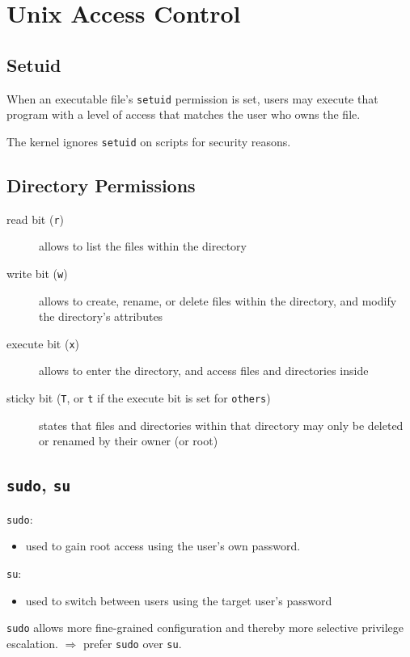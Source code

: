 
\section{Unix Access Control}
\subsection{Setuid}
When an executable file's \texttt{setuid} permission is set, users may execute that
program with a level of access that matches the user who owns the file.

The kernel ignores \texttt{setuid} on scripts for security reasons.
\subsection{Directory Permissions}
\begin{description}
  \item[read bit (\texttt{r})] allows to list the files within the directory
  \item[write bit (\texttt{w})] allows to create, rename, or delete files
    within the directory, and modify the directory's attributes
  \item[execute bit (\texttt{x})] allows  to enter the directory, and access
    files and directories inside
  \item[sticky bit (\texttt{T}, or \texttt{t} if the execute bit is set for
    \texttt{others})] states that files and directories within that directory
    may only be deleted or renamed by their owner (or root)
\end{description}

\subsection{\texttt{sudo}, \texttt{su}}

\texttt{sudo}:
\begin{itemize}
  \item used to gain root access using the user's own password.
\end{itemize}
\texttt{su}:
\begin{itemize}
  \item used to switch between users using the target user's password
\end{itemize}
\texttt{sudo} allows more fine-grained configuration and thereby more selective
privilege escalation. $\Rightarrow$ prefer \texttt{sudo} over \texttt{su}.

